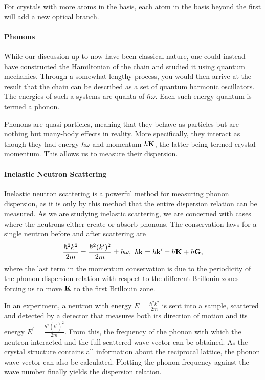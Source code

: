 For crystals with more atoms in the basis, each atom in the basis beyond the first will add a new optical branch.


\paragraph{Phonons}
While our discussion up to now have been classical nature, one could instead have constructed the Hamiltonian of the chain and studied it using quantum mechanics. Through a somewhat lengthy process, you would then arrive at the result that the chain can be described as a set of quantum harmonic oscillators. The energies of such a systems are quanta of $\hbar\omega$. Each such energy quantum is termed a phonon.

Phonons are quasi-particles, meaning that they behave as particles but are nothing but many-body effects in reality. More specifically, they interact as though they had energy $\hbar\omega$ and momentum $\hbar\vb{K}$, the latter being termed crystal momentum. This allows us to measure their dispersion.

\paragraph{Inelastic Neutron Scattering}
Inelastic neutron scattering is a powerful method for measuring phonon dispersion, as it is only by this method that the entire dispersion relation can be measured. As we are studying inelastic scattering, we are concerned with cases where the neutrons either create or absorb phonons. The conservation laws for a single neutron before and after scattering are
\begin{align*}
	\frac{\hbar^{2}k^{2}}{2m} = \frac{\hbar^{2}(k^{\prime})^{2}}{2m} \pm \hbar\omega,\ \hbar\vb{k} = \hbar\vb{k}^{\prime} \pm \hbar\vb{K} + \hbar\vb{G},
\end{align*}
where the last term in the momentum conservation is due to the periodicity of the phonon dispersion relation with respect to the different Brillouin zones forcing us to move $\vb{K}$ to the first Brillouin zone.

In an experiment, a neutron with energy $E = \frac{\hbar^{2}k^{2}}{2m}$ is sent into a sample, scattered and detected by a detector that measures both its direction of motion and its energy $E^{\prime} = \frac{\hbar^{2}(k^{\prime})^{2}}{2m}$. From this, the frequency of the phonon with which the neutron interacted and the full scattered wave vector can be obtained. As the crystal structure contains all information about the reciprocal lattice, the phonon wave vector can also be calculated. Plotting the phonon frequency against the wave number finally yields the dispersion relation.